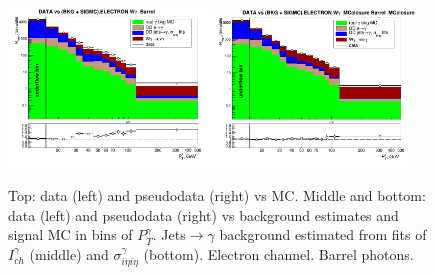 \begin{figure}[htb]
\begin{center}
   \includegraphics[width=0.48\textwidth]{../figs/figs_v11/ELECTRON_WGamma/PrepareYields/c_DATAvsBkgPlusSigMCc_ELECTRON_WGamma_TEMPL_SIHIH_UNblind__Barrel__phoEt.png}\includegraphics[width=0.48\textwidth]{../figs/figs_v11/ELECTRON_WGamma/PrepareYields/c_DATAvsBkgPlusSigMCc_ELECTRON_WGamma_TEMPL_SIHIH_UNblind_MCclosure__Barrel__phoEt_MCclosure.png}
  \caption{Top: data (left) and pseudodata (right) vs MC. Middle and bottom: data (left) and pseudodata (right) vs background estimates and signal MC in bins of $P_T^{\gamma}$. Jets$\rightarrow\gamma$ background estimated from fits of $I_{ch}^{\gamma}$ (middle) and  $\sigma_{i\eta i\eta}^{\gamma}$ (bottom). Electron channel. Barrel photons.}
  \label{fig:DATAvsBKGandSIGMC_MCclosure_ELECTRON_B}
  \end{center}
\end{figure}

